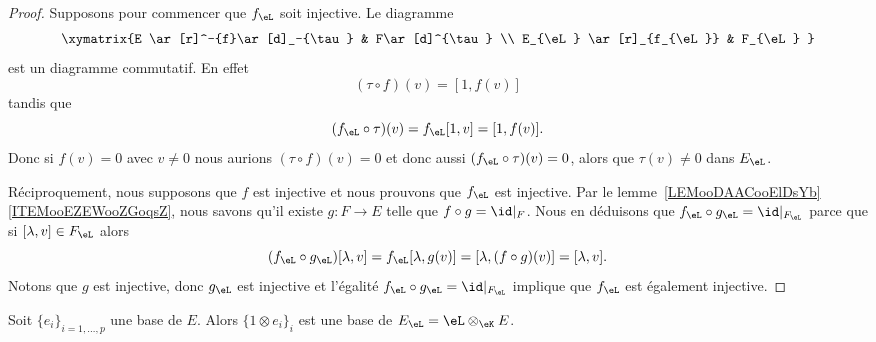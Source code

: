 \begin{proof}
	Supposons pour commencer que \( f_{\eL}\) soit injective.
	Le diagramme
	\begin{equation}
		\xymatrix{%
		E \ar[r]^-{f}\ar[d]_-{\tau} &   F\ar[d]^{\tau}  \\
		E_{\eL} \ar[r]_{f_{\eL}}    &   F_{\eL}
		}
	\end{equation}
	est un diagramme commutatif. En effet
	\begin{equation}
		(\tau\circ f)(v)=[1,f(v)]
	\end{equation}
	tandis que
	\begin{equation}
		(f_{\eL}\circ\tau)(v)=f_{\eL}[1,v]=[1,f(v)].
	\end{equation}
	Donc si \( f(v)=0\) avec \( v\neq 0\) nous aurions \( (\tau\circ f)(v)=0\) et donc aussi \( (f_{\eL}\circ \tau)(v)=0\), alors que \( \tau(v)\neq 0\) dans \( E_{\eL}\).

	Réciproquement, nous supposons que \( f\) est injective et nous prouvons que \( f_{\eL}\) est injective. Par le lemme~\ref{LEMooDAACooElDsYb}\ref{ITEMooEZEWooZGoqsZ}, nous savons qu'il existe \( g\colon F\to E\) telle que \( f\circ g=\id|_F\). Nous en déduisons que \( f_{\eL}\circ g_{\eL}=\id|_{F_{\eL}}\) parce que si \( [\lambda,v]\in F_{\eL}\) alors
	\begin{equation}
		(f_{\eL}\circ g_{\eL})[\lambda,v]=f_{\eL}[\lambda,g(v)]=[\lambda,(f\circ g)(v)]=[\lambda,v].
	\end{equation}
	Notons que \( g\) est injective, donc \( g_{\eL}\) est injective et l'égalité \( f_{\eL}\circ g_{\eL}=\id|_{F_{\eL}} \) implique que \( f_{\eL}\) est également injective.
\end{proof}

\begin{proposition} \label{PROPooMHARooUycAts}
	Soit \( \{ e_i \}_{i=1,\ldots, p}\) une base de \( E\). Alors \( \{ 1\otimes e_i \}_i\) est une base de \( E_{\eL}=\eL\otimes_{\eK}E\).
\end{proposition}

